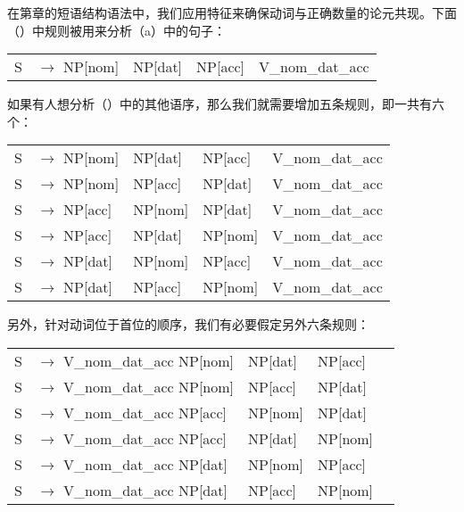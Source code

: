 \noindent
在第章的短语结构语法中，我们应用特征来确保动词与正确数量的论元共现。下面（）中规则被用来分析（a）中的句子：
\ea
\begin{tabular}[t]{@{}l@{ }l@{ }l@{ }l@{ }l@{ }}
S  & $\to$ NP[nom]& NP[dat] & NP[acc] & V\_nom\_dat\_acc\\
\end{tabular}
\z
如果有人想分析（）中的其他语序，那么我们就需要增加五条规则，即一共有六个：
\ea
\label{Regeln-PSG-Abfolge}
\begin{tabular}[t]{@{}l@{ }l@{ }l@{ }l@{ }l@{ }}
S  & $\to$ NP[nom]& NP[dat] & NP[acc] & V\_nom\_dat\_acc\\
S  & $\to$ NP[nom]& NP[acc] & NP[dat] & V\_nom\_dat\_acc\\
S  & $\to$ NP[acc]& NP[nom] & NP[dat] & V\_nom\_dat\_acc\\
S  & $\to$ NP[acc]& NP[dat] & NP[nom] & V\_nom\_dat\_acc\\
S  & $\to$ NP[dat]& NP[nom] & NP[acc] & V\_nom\_dat\_acc\\
S  & $\to$ NP[dat]& NP[acc] & NP[nom] & V\_nom\_dat\_acc\\
\end{tabular}
\z

\noindent
另外，针对动词位于首位的顺序，我们有必要假定另外六条规则：
\ea
\begin{tabular}[t]{@{}l@{ }l@{ }l@{ }l@{ }l}
S  & $\to$ V\_nom\_dat\_acc NP[nom]& NP[dat] & NP[acc]\\
S  & $\to$ V\_nom\_dat\_acc NP[nom]& NP[acc] & NP[dat]\\
S  & $\to$ V\_nom\_dat\_acc NP[acc]& NP[nom] & NP[dat]\\
S  & $\to$ V\_nom\_dat\_acc NP[acc]& NP[dat] & NP[nom]\\
S  & $\to$ V\_nom\_dat\_acc NP[dat]& NP[nom] & NP[acc]\\
S  & $\to$ V\_nom\_dat\_acc NP[dat]& NP[acc] & NP[nom]\\
\end{tabular}
\z

